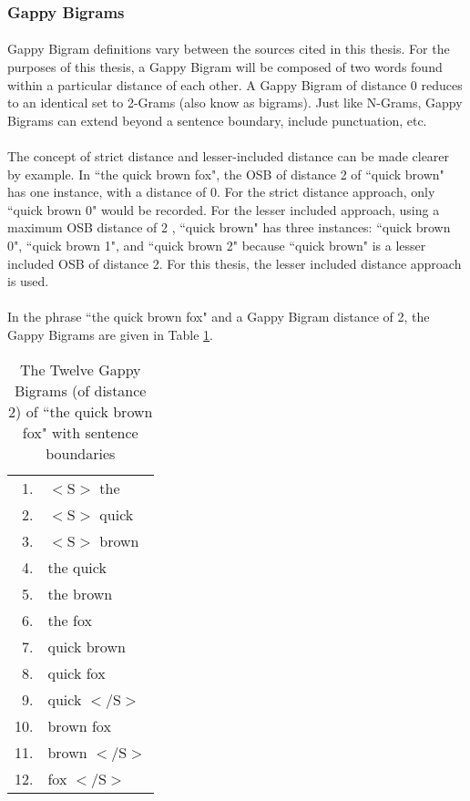 	\subsubsection{Gappy Bigrams}
		\paragraph{} Gappy Bigram definitions vary between the sources cited in this thesis.  For the purposes of this thesis, a Gappy Bigram will be composed of two words found within a particular distance of each other.  A Gappy Bigram of distance 0 reduces to an identical set to 2-Grams (also know as bigrams). Just like N-Grams, Gappy Bigrams can extend beyond a sentence boundary, include punctuation, etc. 
		
		\paragraph*{}The concept of strict distance and lesser-included distance can be made clearer by example. In ``the quick brown fox", the OSB of distance 2 of ``quick brown" has one instance, with a distance of 0. For the strict distance approach, only ``quick brown 0" would be recorded. For the lesser included approach, using a maximum OSB distance of 2 , ``quick brown" has three instances: ``quick brown 0", ``quick brown 1", and ``quick brown 2" because ``quick brown" is a lesser included OSB of distance 2.  For this thesis, the lesser included distance approach is used.		
		
		\paragraph*{}In the phrase ``the quick brown fox" and a Gappy Bigram distance of 2, the Gappy Bigrams are given in Table \ref{table:2gappybigrams}.
		\begin{center}
			\begin{table}[h]
				\begin{center}
					\begin{tabular}{ r l}
					1. &  $<\text{S}>$ the\\
					2. &  $<\text{S}>$ quick\\
					3. &  $<\text{S}>$ brown\\
					4. &  the quick\\
					5. &  the brown\\
					6. &  the fox\\
					7. &  quick brown\\
					8. &  quick fox\\
					9. &  quick $<\text{/S}>$\\
					10.&  brown fox\\
					11.&  brown $<\text{/S}>$\\
					12.&  fox $<\text{/S}>$\\
					\end{tabular}
					\caption{The Twelve Gappy Bigrams (of distance 2) of ``the quick brown fox" with sentence boundaries}
					\label{table:2gappybigrams}
				\end{center}
			\end{table}
		\end{center}
		
